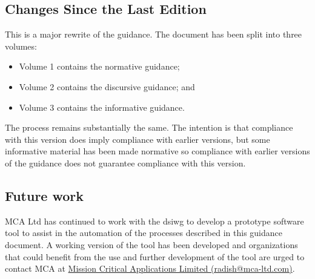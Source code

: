 \subsection*{Changes Since the Last Edition}%
This is a major rewrite of the guidance. The document has been split into three volumes:
\begin{itemize}
	\item Volume 1 contains the normative guidance;
	\item Volume 2 contains the discursive guidance; and
	\item Volume 3 contains the informative guidance.
\end{itemize}
The process remains substantially the same. The intention is that compliance with this version does imply compliance with earlier versions, but some informative material has been made normative so compliance with earlier versions of the guidance does not guarantee compliance with this version.
\subsection*{Future work}

MCA Ltd has continued to work with the \gls{dsiwg} to develop a prototype software tool to assist in the automation of the processes described in this guidance document.
A working version of the tool has been developed and organizations that could benefit from the use and further development of the tool are urged to contact MCA at \href{mailto:radish@mca-ltd.com}{Mission Critical Applications Limited (radish@mca-ltd.com)}.

